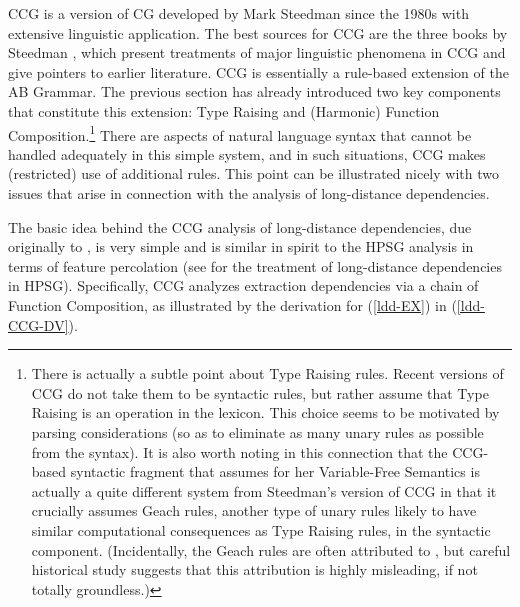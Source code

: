 \documentclass[output=paper,biblatex,babelshorthands,newtxmath,draftmode,colorlinks,citecolor=brown]{langscibook}
\begin{document}
CCG is a version of CG developed by Mark Steedman since the 1980s with
extensive linguistic application. The best sources for CCG are the
three books by Steedman \citep{Steedman97a,Steedman2000a-u,steedman2012},
which present treatments of major linguistic phenomena in CCG and
give pointers to earlier literature. CCG is essentially a rule-based
extension of the AB Grammar. The previous
section has already introduced two key components that constitute this extension: Type
Raising and (Harmonic) Function Composition.\footnote{There is
actually a subtle point about Type Raising rules. Recent
versions of CCG \citep[80]{steedman2012} do not take them to be syntactic rules,
but rather assume that Type Raising is an operation in the lexicon.
This choice seems to be motivated by 
parsing considerations (so as to eliminate as  many unary rules as
possible from the syntax). It is also worth noting in this
connection that the CCG-based syntactic fragment that
\citet{Jacobson1999a,Jacobson2000a} assumes for her Variable-Free Semantics
is actually a quite different system from Steedman's version of CCG in
that it crucially assumes Geach rules, another type of unary rules
likely to have similar computational consequences as Type Raising rules, in the syntactic
component. (Incidentally,  the Geach rules are often attributed
to \citet{Geach70a},  but  careful
historical study suggests that this attribution is highly misleading, if not
totally groundless.)} There are 
aspects of natural language syntax that cannot 
be handled adequately in this simple system, and in such situations,
CCG makes (restricted) use of additional rules. This point can be
illustrated nicely with two issues that arise in connection with the
analysis of long-distance dependencies.

The basic idea behind the CCG analysis of long-distance dependencies,
due originally to \citet{AS82a}, is very simple and is similar in spirit to
the HPSG analysis in terms of \slasch feature percolation (see
for the treatment of long-distance dependencies in HPSG). Specifically,
CCG analyzes extraction dependencies via a chain of Function
Composition, as illustrated by the derivation for (\ref{ldd-EX}) in (\ref{ldd-CCG-DV}).
\end{document}
